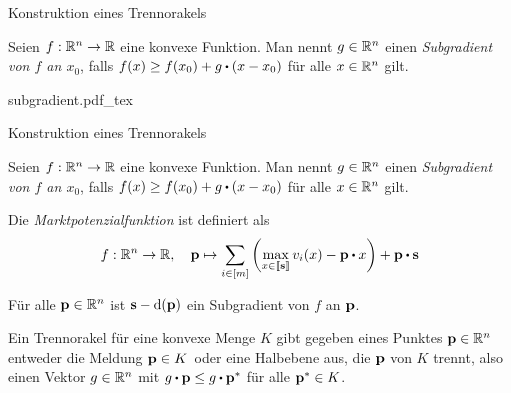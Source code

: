 \begin{frame}[t]{Konstruktion eines Trennorakels}
\pause\begin{definition}[Subgradient]
	Seien $f:\mathbb{R}^n \rightarrow \mathbb{R}$ eine konvexe Funktion.
	Man nennt $g\in\mathbb{R}^n$ einen \emph{Subgradient von $f$ an $x_0$}, falls $f(x)\geq f(x_0) + g \bcdot (x - x_0)$ für alle $x\in\mathbb{R}^n$ gilt.
\end{definition}
\def\svgwidth{\columnwidth}
	{subgradient.pdf_tex}
\end{frame}

\begin{frame}[t]{Konstruktion eines Trennorakels}
\addtocounter{theorem}{-1}
\vspace{0.2em}
\begin{definition}[Subgradient]
	Seien $f:\mathbb{R}^n \rightarrow \mathbb{R}$ eine konvexe Funktion.
	Man nennt $g\in\mathbb{R}^n$ einen \emph{Subgradient von $f$ an $x_0$}, falls $f(x)\geq f(x_0) + g \bcdot (x - x_0)$ für alle $x\in\mathbb{R}^n$ gilt.
\end{definition}
\vspace{-0.4em}
\begin{definition}[Marktpotenzialfunktion]
Die \emph{Marktpotenzialfunktion} ist definiert als
\[ f: \R^n \rightarrow \R, \quad \fp \mapsto \sum_{i\in\first{m}} \left( 
\max_{x\in\ffirst{\fs}} v_i(x) - \fp \bcdot x
\right) + \fp\bcdot \fs \]
\end{definition}
\vspace{-0.4em}
\pause \begin{lemma}
Für alle $\mathbf{p}\in\mathbb{R}^n$ ist $\mathbf{s} - \operatorname{d}(\mathbf{p})$ ein Subgradient von $f$ an $\mathbf{p}$.
\end{lemma}
\vspace{-0.4em}
\pause \begin{definition}[Trennorakel]
	Ein Trennorakel für eine konvexe Menge $K$ gibt gegeben eines Punktes $\mathbf{p}\in\mathbb{R}^n$ entweder die Meldung \glqq $\mathbf{p}\in K$\grqq\ oder eine Halbebene aus, die $\mathbf{p}$ von $K$ trennt, also einen Vektor $g\in\mathbb{R}^n$ mit $g\bcdot \fp \leq g \bcdot \fp^*$ für alle $\mathbf{p}^*\in K$.
\end{definition}
\end{frame}

